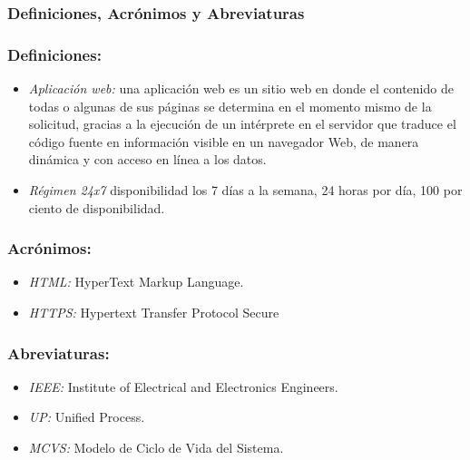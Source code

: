  
    \subsubsection{Definiciones, Acrónimos y Abreviaturas}
    \subsubsection{Definiciones:}
  
        \begin{itemize}
 
        \item \emph{Aplicación web:} una aplicación web es un sitio web en donde el contenido de todas o algunas de sus páginas se determina en el momento mismo de la solicitud, gracias a la ejecución de un intérprete en el servidor que traduce el código fuente en información visible en un navegador Web, de manera dinámica y con acceso en línea a los datos.
 
        \item \emph{Régimen 24x7} disponibilidad los 7 días a la semana, 24 horas por día, 100 por ciento de disponibilidad.
        \end{itemize}

        \subsubsection{Acrónimos:}

        \begin{itemize}

        \item \emph{HTML:} HyperText Markup Language.
        
        \item \emph{HTTPS:} Hypertext Transfer Protocol Secure

        \end{itemize}
 
        \subsubsection{Abreviaturas:}

        \begin{itemize}

        \item \emph{IEEE:} Institute of Electrical and Electronics Engineers.
 
        \item \emph{UP:} Unified Process.

        \item \emph{MCVS:} Modelo de Ciclo de Vida del Sistema.

         \end{itemize}
    

